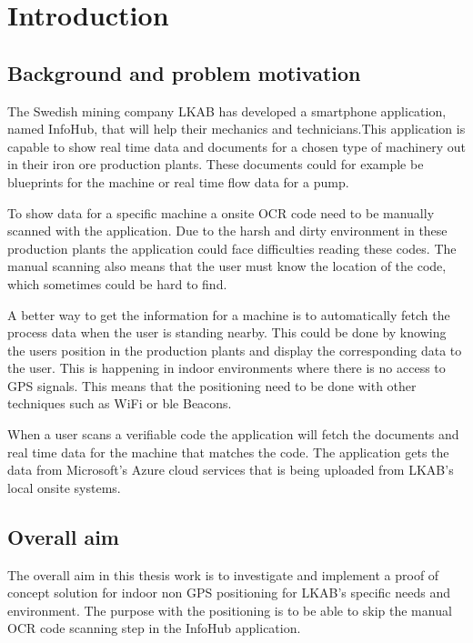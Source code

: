\chapter{Introduction}\label{sec:intro} 

\section{Background and problem motivation}\label{sec:introBackground}
The Swedish mining company LKAB has developed
a smartphone application, named InfoHub, that will help their mechanics and
technicians.This application is capable to show real time data and documents
for a chosen type of machinery out in their iron ore production plants.
These documents could for example be blueprints for the machine or real time flow data for a pump.

\bigskip

To show data for a specific machine a onsite OCR code need to be manually scanned with the application.
Due to the harsh and dirty environment in these
production plants the application could face difficulties reading these codes.
The manual scanning also means that the user must know the location of the code,
which sometimes could be hard to find.

\bigskip

A better way to get the information for a machine is to automatically fetch the
process data when the user is standing nearby.  This could be done by knowing
the users position in the production plants and display the corresponding data
to the user.  This is happening in indoor environments where there is no access
to GPS signals.  This means that the positioning need to be done with other
techniques such as WiFi or \acrlong{ble} Beacons.

\bigskip

When a user scans a verifiable code the application will fetch the documents and
real time data for the machine that matches the code.  The application gets the
data from Microsoft's Azure cloud services that is being uploaded from LKAB's
local onsite systems.


\section{Overall aim}\label{sec:introOverallAim}
The overall aim in this thesis work is to investigate and implement a proof of concept solution for indoor non GPS positioning for LKAB's specific needs and environment.
The purpose with the positioning is to be able to skip the manual OCR code scanning step in the InfoHub application.


